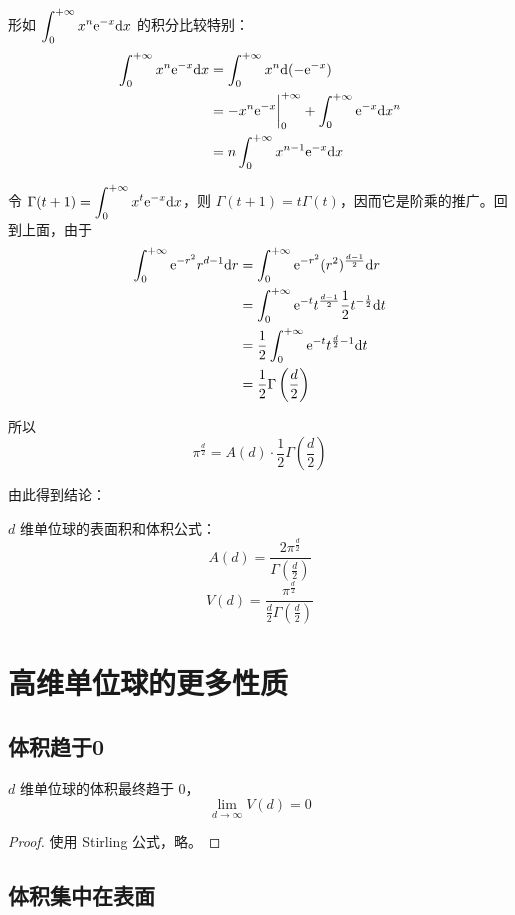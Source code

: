 形如 $\displaystyle \int_0^{+\infty} x^n \mathrm{e}^{-x} \mathrm{d} x$ 的积分比较特别：
\begin{align*}
	\int_0^{+\infty} x^n \mathrm{e}^{-x} \mathrm{d} x &= \int_0^{+\infty} x^n \mathrm{d}(-\mathrm{e}^{-x}) \\
	&= -x^n \mathrm{e}^{-x} \bigg|_0^{+\infty} + \int_0^{+\infty} \mathrm{e}^{-x} \mathrm{d} x^n \\
	&= n \int_0^{+\infty} x^{n-1} \mathrm{e}^{-x} \mathrm{d} x
\end{align*}

令 $\Gamma(t+1) = \displaystyle \int_0^{+\infty} x^t \mathrm{e}^{-x} \mathrm{d} x$，则 $\Gamma(t+1) = t\Gamma(t)$，因而它是阶乘的推广。回到上面，由于
\begin{align*}
    \int_{0}^{+\infty}\mathrm{e}^{-r^{2}}r^{d-1}\mathrm{d} r &= \int_{0}^{+\infty}\mathrm{e}^{-r^{2}}(r^{2})^{\frac{d-1}{2}}\mathrm{d} r \\
    &= \int_{0}^{+\infty}\mathrm{e}^{-t} t^{\frac{d-1}{2}} \frac{1}{2} t^{-\frac{1}{2}} \mathrm{d} t \\
    &= \frac{1}{2}\int_{0}^{+\infty}\mathrm{e}^{-t}t^{\frac{d}{2}-1}\mathrm{d} t \\
	&= \frac{1}{2}\Gamma\left(\frac{d}{2}\right)
\end{align*}

所以
\[
    \pi^{\frac{d}{2}}=A(d)\cdot\frac{1}{2}\Gamma\left(\frac{d}{2}\right)
\]

由此得到结论：

\begin{theorem}
$d$ 维单位球的表面积和体积公式：
\[
	A(d)=\frac{2\pi^{\frac{d}{2}}}{\Gamma(\frac{d}{2})}
\]
\[
	V(d)=\frac{\pi^{\frac{d}{2}}}{\frac{d}{2}\Gamma(\frac{d}{2})}
\]
\end{theorem}

\section{高维单位球的更多性质}

\subsection{体积趋于0}

\begin{theorem}
    $d$ 维单位球的体积最终趋于 $0$，
    \[\lim_{d \to \infty} V(d) = 0\]
\end{theorem}

\begin{proof}
    使用 Stirling 公式，略。
\end{proof}

\subsection{体积集中在表面}

